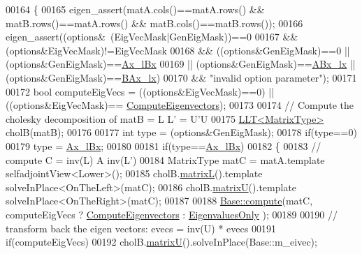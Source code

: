 \begin{DoxyCode}
00164 \{
00165   eigen\_assert(matA.cols()==matA.rows() && matB.rows()==matA.rows() && matB.cols()==matB.rows());
00166   eigen\_assert((options&~(EigVecMask|GenEigMask))==0
00167           && (options&EigVecMask)!=EigVecMask
00168           && ((options&GenEigMask)==0 || (options&GenEigMask)==\hyperlink{group__enums_ggae3e239fb70022eb8747994cf5d68b4a9a1a7cefbb22c2c3928d246b753cf53633}{Ax\_lBx}
00169            || (options&GenEigMask)==\hyperlink{group__enums_ggae3e239fb70022eb8747994cf5d68b4a9afc36646eaa4187858eaad466d32a2096}{ABx\_lx} || (options&GenEigMask)==\hyperlink{group__enums_ggae3e239fb70022eb8747994cf5d68b4a9a5b64c528c90483f0b716018cad0143f8}{BAx\_lx})
00170           && \textcolor{stringliteral}{"invalid option parameter"});
00171 
00172   \textcolor{keywordtype}{bool} computeEigVecs = ((options&EigVecMask)==0) || ((options&EigVecMask)==
      \hyperlink{group__enums_ggae3e239fb70022eb8747994cf5d68b4a9ada93d8885bde32b876ba4af01d3292cc}{ComputeEigenvectors});
00173 
00174   \textcolor{comment}{// Compute the cholesky decomposition of matB = L L' = U'U}
00175   \hyperlink{group___cholesky___module_class_eigen_1_1_l_l_t}{LLT<MatrixType>} cholB(matB);
00176 
00177   \textcolor{keywordtype}{int} type = (options&GenEigMask);
00178   \textcolor{keywordflow}{if}(type==0)
00179     type = \hyperlink{group__enums_ggae3e239fb70022eb8747994cf5d68b4a9a1a7cefbb22c2c3928d246b753cf53633}{Ax\_lBx};
00180 
00181   \textcolor{keywordflow}{if}(type==\hyperlink{group__enums_ggae3e239fb70022eb8747994cf5d68b4a9a1a7cefbb22c2c3928d246b753cf53633}{Ax\_lBx})
00182   \{
00183     \textcolor{comment}{// compute C = inv(L) A inv(L')}
00184     MatrixType matC = matA.template selfadjointView<Lower>();
00185     cholB.\hyperlink{group___cholesky___module_a7f4a3eedbf82e7ce2d6bf0dcd84cdfa3}{matrixL}().template solveInPlace<OnTheLeft>(matC);
00186     cholB.\hyperlink{group___cholesky___module_a18a390f085567e650e8345cc7e7c0df8}{matrixU}().template solveInPlace<OnTheRight>(matC);
00187 
00188     \hyperlink{group___eigenvalues___module_a88bcdc24112efa7c4d2ebb3476efcbe9}{Base::compute}(matC, computeEigVecs ? \hyperlink{group__enums_ggae3e239fb70022eb8747994cf5d68b4a9ada93d8885bde32b876ba4af01d3292cc}{ComputeEigenvectors} : 
      \hyperlink{group__enums_ggae3e239fb70022eb8747994cf5d68b4a9ad0c82cf0a9daf2a63bb6e2f10d51f69c}{EigenvaluesOnly} );
00189 
00190     \textcolor{comment}{// transform back the eigen vectors: evecs = inv(U) * evecs}
00191     \textcolor{keywordflow}{if}(computeEigVecs)
00192       cholB.\hyperlink{group___cholesky___module_a18a390f085567e650e8345cc7e7c0df8}{matrixU}().solveInPlace(Base::m\_eivec);

\end{DoxyCode}
